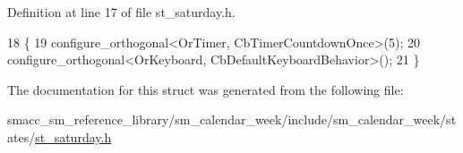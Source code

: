 Definition at line 17 of file st\+\_\+saturday.\+h.


\begin{DoxyCode}
18     \{
19         configure\_orthogonal<OrTimer,  CbTimerCountdownOnce>(5);   
20         configure\_orthogonal<OrKeyboard, CbDefaultKeyboardBehavior>();
21     \}
\end{DoxyCode}


The documentation for this struct was generated from the following file\+:\begin{DoxyCompactItemize}
\item 
smacc\+\_\+sm\+\_\+reference\+\_\+library/sm\+\_\+calendar\+\_\+week/include/sm\+\_\+calendar\+\_\+week/states/\hyperlink{sm__calendar__week_2include_2sm__calendar__week_2states_2st__saturday_8h}{st\+\_\+saturday.\+h}\end{DoxyCompactItemize}

